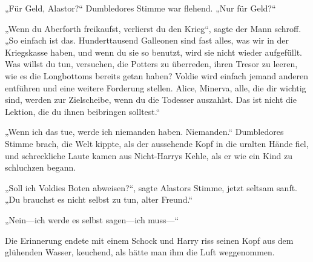 \begin{em}
„Für Geld, Alastor?“ Dumbledores Stimme war flehend. „Nur für Geld?“

„Wenn du Aberforth freikaufst, verlierst du den Krieg“, sagte der Mann schroff. „So einfach ist das. Hunderttausend Galleonen sind fast alles, was wir in der Kriegskasse haben, und wenn du sie so benutzt, wird sie nicht wieder aufgefüllt. Was willst du tun, versuchen, die Potters zu überreden, ihren Tresor zu leeren, wie es die Longbottoms bereits getan haben? Voldie wird einfach jemand anderen entführen und eine weitere Forderung stellen. Alice, Minerva, alle, die dir wichtig sind, werden zur Zielscheibe, wenn du die Todesser auszahlst. Das ist nicht die Lektion, die du ihnen beibringen solltest.“

„Wenn ich das tue, werde ich niemanden haben. Niemanden.“ Dumbledores Stimme brach, die Welt kippte, als der aussehende Kopf in die uralten Hände fiel, und schreckliche Laute kamen aus Nicht-Harrys Kehle, als er wie ein Kind zu schluchzen begann.

„Soll ich Voldies Boten abweisen?“, sagte Alastors Stimme, jetzt seltsam sanft. „Du brauchst es nicht selbst zu tun, alter Freund.“

„Nein—ich werde es selbst sagen—ich muss—“
\end{em}

\later

Die Erinnerung endete mit einem Schock und Harry riss seinen Kopf aus dem glühenden Wasser, keuchend, als hätte man ihm die Luft weggenommen.

